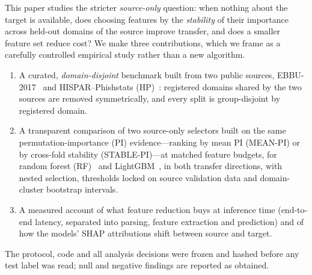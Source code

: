 This paper studies the stricter \emph{source-only} question: when nothing about the target is available, does choosing features by the \emph{stability} of their importance across held-out domains of the source improve transfer, and does a smaller feature set reduce cost? We make three contributions, which we frame as a carefully controlled empirical study rather than a new algorithm.
\begin{enumerate}
\item A curated, \emph{domain-disjoint} benchmark built from two public sources, EBBU-2017~\cite{sahingoz2019} and HISPAR--Phishstats (HP)~\cite{rashid2024}: registered domains shared by the two sources are removed symmetrically, and every split is group-disjoint by registered domain.
\item A transparent comparison of two source-only selectors built on the same permutation-importance (PI) evidence---ranking by mean PI (MEAN-PI) or by cross-fold stability (STABLE-PI)---at matched feature budgets, for random forest (RF)~\cite{breiman2001} and LightGBM~\cite{ke2017}, in both transfer directions, with nested selection, thresholds locked on source validation data and domain-cluster bootstrap intervals.
\item A measured account of what feature reduction buys at inference time (end-to-end latency, separated into parsing, feature extraction and prediction) and of how the models' SHAP attributions shift between source and target.
\end{enumerate}
The protocol, code and all analysis decisions were frozen and hashed before any test label was read; null and negative findings are reported as obtained.
